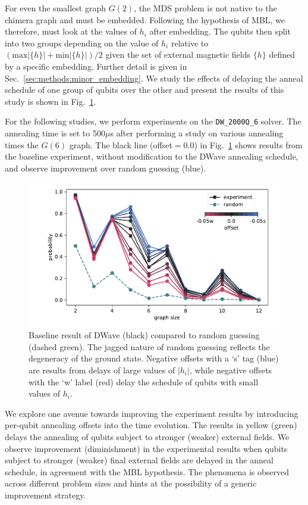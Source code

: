 \documentclass[prd,twocolumn,tightenlines,preprintnumbers,showpacs,superscriptaddress,notitlepage,nofootinbib,eqsecnum,floatfix,longbibliography,aps,10pt]{revtex4-2}
\begin{document}
For even the smallest graph $G(2)$, the MDS problem is not native to the chimera graph and must be embedded. Following the hypothesis of MBL, we therefore, must look at the values of $h_i$ after embedding. The qubits then split into two groups depending on the value of $h_i$ relative to $(\textrm{max}|\{h\}| + \textrm{min}|\{h\}|) / 2$ given the set of external magnetic fields $\{h\}$ defined by a specific embedding. Further detail is given in Sec.~\ref{sec:methods:minor_embedding}. We study the effects of delaying the anneal schedule of one group of qubits over the other and present the results of this study is shown in Fig.~\ref{fig:baseline}.

For the following studies, we perform experiments on the \texttt{DW\_2000Q\_6} solver. The annealing time is set to 500$\mu$s after performing a study on various annealing times the $G(6)$ graph. The black line (offset$=0.0$) in Fig.~\ref{fig:baseline} shows results from the baseline experiment, without modification to the DWave annealing schedule, and observe improvement over random guessing (blue).

\begin{figure}
	\centering
	\includegraphics[width=\columnwidth]{./new_figures/DWave_scaling.pdf}
	\caption{Baseline result of DWave (black) compared to random guessing (dashed green). The jagged nature of random guessing reflects the degeneracy of the ground state. Negative offsets with a `s' tag (blue) are results from delays of large values of $|h_i|$, while negative offsets with the `w' label (red) delay the schedule of qubits with small values of $h_i$.}
	\label{fig:baseline}
\end{figure}

We explore one avenue towards improving the experiment results by introducing per-qubit annealing offsets into the time evolution.
The results in yellow (green) delays the annealing of qubits subject to stronger (weaker) external fields. We observe improvement (diminishment) in the experimental results when qubits subject to stronger (weaker) final external fields are delayed in the anneal schedule, in agreement with the MBL hypothesis. The phenomena is observed across different problem sizes and hints at the possibility of a generic improvement strategy.
\end{document}
